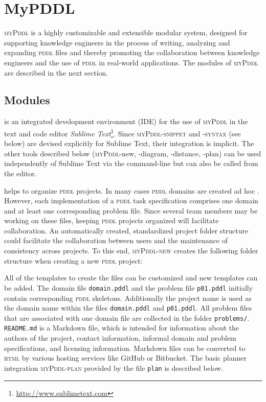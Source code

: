 \documentclass[runningheads]{llncs}
\newcommand{\mypddl}{\textsc{myPddl}\xspace}
\newcommand{\mypddlnew}{\textsc{myPddl-new}\xspace}
\newcommand{\mypddlsnippet}{\textsc{myPddl-snippet}\xspace}
\newcommand{\mypddlplan}{\textsc{myPddl-plan}\xspace}
\newcommand{\pddl}{\textsc{pddl}\xspace}
\newcommand{\sublimetext}{Sublime Text\xspace}
\begin{document}
\section{MyPDDL}
\label{sec:mypddl}

\mypddl is a highly customizable and extensible modular system,
designed for supporting knowledge engineers in the process of writing,
analyzing and expanding \pddl files and thereby promoting the
collaboration between knowledge engineers and the use of \pddl in
real-world applications. The modules of \mypddl are described in the
next section.

\subsection{Modules}

\begin{description}
  \setlength\itemsep{1em}
\item[myPDDL-IDE] is an integrated development environment (IDE) for
  the use of \mypddl in the text and code editor \emph{Sublime
    Text}\footnote{\url{http://www.sublimetext.com}}. Since
  \mypddlsnippet and \textsc{-syntax} (see below) are devised
  explicitly for \sublimetext, their integration is implicit. The
  other tools described below (\mypddl-new, -diagram, -distance,
  -plan) can be used independently of \sublimetext via the
  command-line but can also be called from the editor.

\item[myPDDL-new] helps to organize \pddl projects. In many cases
  \pddl domains are created ad hoc \cite{shah2013exploring}. However,
  each implementation of a \pddl task specification comprises one
  domain and at least one corresponding problem file. Since several
  team members may be working on these files, keeping \pddl projects
  organized will facilitate collaboration. An automatically created,
  standardized project folder structure could facilitate the
  collaboration between users and the maintenance of consistency
  across projects. To this end, \mypddlnew creates the following
  folder structure when creating a new \pddl project:
  \begin{figure}[H]
\end{figure}
All of the templates to create the files can be customized and new
templates can be added. The domain file \texttt{domain.pddl} and the
problem file \texttt{p01.pddl} initially contain corresponding \pddl
skeletons. Additionally the project name is used as the domain name
within the files \texttt{domain.pddl} and \texttt{p01.pddl}. All
problem files that are associated with one domain file are collected
in the folder \texttt{problems/}. \texttt{README.md} is a Markdown
file, which is intended for information about the authors of the
project, contact information, informal domain and problem
specifications, and licensing information.  Markdown files can be
converted to \textsc{html} by various hosting services like GitHub or
Bitbucket. The basic planner integration \mypddlplan provided by the
file \texttt{plan} is described below.


\end{description}
\end{document}
